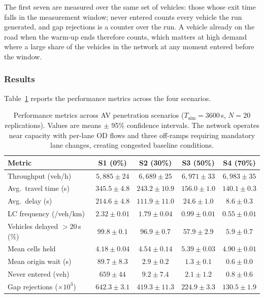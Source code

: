 \documentclass[review,authoryear]{elsarticle}
\begin{document}
The first seven are measured over the same set of vehicles: those whose exit time falls in the measurement window; never entered counts every vehicle the run generated, and gap rejections is a counter over the run. A vehicle already on the road when the warm-up ends therefore counts, which matters at high demand where a large share of the vehicles in the network at any moment entered before the window.

\subsubsection{Results}

Table~\ref{tab:results_mixed} reports the performance metrics across the four scenarios.

\begin{table}[ht]
\centering
\caption{Performance metrics across AV penetration scenarios ($T_{\text{sim}} = 3600$\,s, $N = 20$ replications). Values are means $\pm$ 95\% confidence intervals. The network operates near capacity with per-lane OD flows and three off-ramps requiring mandatory lane changes, creating congested baseline conditions.}
\label{tab:results_mixed}
\begin{tabular}{@{}lcccc@{}}
\toprule
Metric & S1 (0\%) & S2 (30\%) & S3 (50\%) & S4 (70\%) \\
\midrule
Throughput (veh/h) & $5{,}885 \pm 24$ & $6{,}689 \pm 25$ & $6{,}971 \pm 33$ & $6{,}983 \pm 35$ \\
Avg.\ travel time (s) & $345.5 \pm 4.8$ & $243.2 \pm 10.9$ & $156.0 \pm 1.0$ & $140.1 \pm 0.3$ \\
Avg.\ delay (s) & $214.6 \pm 4.8$ & $111.9 \pm 11.0$ & $24.6 \pm 1.0$ & $8.6 \pm 0.3$ \\
LC frequency (/veh/km) & $2.32 \pm 0.01$ & $1.79 \pm 0.04$ & $0.99 \pm 0.01$ & $0.55 \pm 0.01$ \\
Vehicles delayed $>20$\,s (\%) & $99.8 \pm 0.1$ & $96.9 \pm 0.7$ & $57.9 \pm 2.9$ & $5.9 \pm 0.7$ \\
Mean cells held & $4.18 \pm 0.04$ & $4.54 \pm 0.14$ & $5.39 \pm 0.03$ & $4.90 \pm 0.01$ \\
Mean origin wait (s) & $89.7 \pm 8.3$ & $2.9 \pm 0.2$ & $1.3 \pm 0.1$ & $0.6 \pm 0.0$ \\
Never entered (veh) & $659 \pm 44$ & $9.2 \pm 7.4$ & $2.1 \pm 1.2$ & $0.8 \pm 0.6$ \\
Gap rejections ($\times 10^3$) & $642.3 \pm 3.1$ & $419.3 \pm 11.3$ & $224.9 \pm 3.3$ & $130.5 \pm 1.9$ \\
\bottomrule
\end{tabular}
\end{table}
\end{document}
